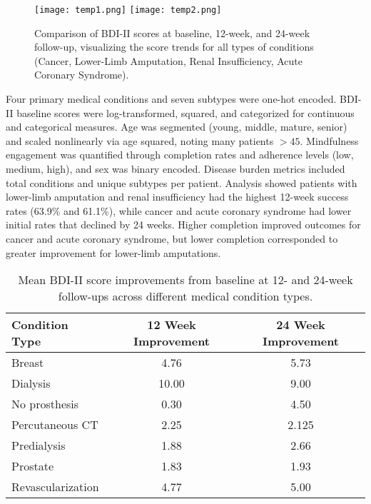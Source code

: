 \documentclass[conference]{IEEEtran}
\begin{document}
\begin{figure*}
    \centering
    \texttt{[image: temp1.png]}
    \texttt{[image: temp2.png]}
    \caption{Comparison of BDI-II scores at baseline, 12-week, and 24-week follow-up, visualizing the score trends for all types of conditions (Cancer, Lower-Limb Amputation, Renal Insufficiency, Acute Coronary Syndrome).}
    \label{fig:bdi_distri_hospital}
\end{figure*}

Four primary medical conditions and seven subtypes were one-hot encoded. BDI-II baseline scores were log-transformed, squared, and categorized for continuous and categorical measures. Age was segmented (young, middle, mature, senior) and scaled nonlinearly via age squared, noting many patients $>45$. Mindfulness engagement was quantified through completion rates and adherence levels (low, medium, high), and sex was binary encoded. Disease burden metrics included total conditions and unique subtypes per patient. Analysis showed patients with lower-limb amputation and renal insufficiency had the highest 12-week success rates (63.9\% and 61.1\%), while cancer and acute coronary syndrome had lower initial rates that declined by 24 weeks. Higher completion improved outcomes for cancer and acute coronary syndrome, but lower completion corresponded to greater improvement for lower-limb amputations.




\begin{table}[ht]
\centering
\caption{Mean BDI-II score improvements from baseline at 12- and 24-week follow-ups across different medical condition types.}
\begin{tabularx}{\linewidth}{|X|c|c|}
\hline
\textbf{Condition Type} & \textbf{12 Week Improvement} & \textbf{24 Week Improvement} \\
\hline
Breast & 4.76 & 5.73 \\ 
Dialysis & 10.00 & 9.00 \\ 
No prosthesis & 0.30 & 4.50 \\ 
Percutaneous CT & 2.25 & 2.125 \\ 
Predialysis & 1.88 & 2.66 \\ 
Prostate & 1.83 & 1.93 \\ 
Revascularization & 4.77 & 5.00 \\ 
\hline
\end{tabularx}
\label{tab:bdii_improvement}
\end{table}
\end{document}
